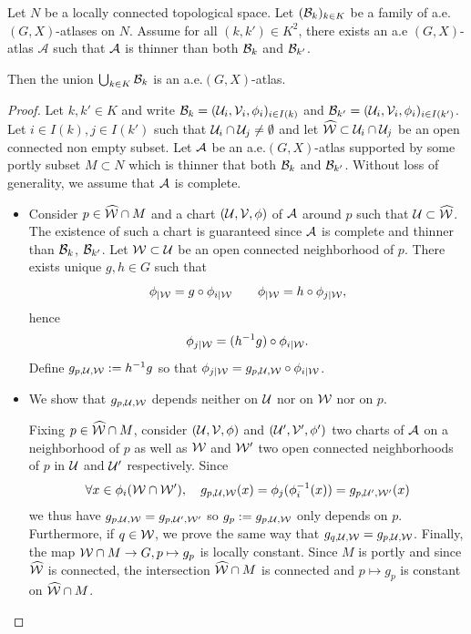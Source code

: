     \begin{lem} \label{lem:GX_atlas_union}
        Let $N$ be a locally connected topological space.
        Let $(\mathcal B_k)_{k\in K}$ be a family of a.e.$(G,X)$-atlases on $N$. Assume for  all $(k,k')\in K^2$, there exists an a.e $(G,X)$-atlas $\mathcal A$ such that $\mathcal A$ is thinner than both $\mathcal B_{k}$ and $\mathcal B_{k'}$.


            Then the union $\bigcup_{k\in K} \mathcal B_k$ is an a.e.$(G,X)$-atlas.
    \end{lem}
					\begin{proof}
					Let $k,k'\in K$ and write $\mathcal B_k=(\mathcal{U}_i,\mathcal V_i,\phi_i)_{i\in I(k)}$ and
					$\mathcal B_{k'}=(\mathcal{U}_i,\mathcal V_i,\phi_i)_{i\in I(k')}$.
					Let $i\in I(k), j\in I(k')$ such that $\mathcal{U}_i\cap \mathcal{U}_j \neq \emptyset$ and let $\widehat{\mathcal W} \subset\mathcal{U}_i\cap\mathcal{U}_j$ be an open connected non empty subset.
					Let $\mathcal A$ be an a.e.$(G,X)$-atlas supported by some portly subset $M\subset N$ which is thinner that both $\mathcal B_{k}$ and $\mathcal B_{k'}$. Without loss of generality, we assume that $\mathcal A$ is complete. 
					
					\begin{itemize}
					 \item Consider $p\in \widehat{\mathcal W}\cap M$ and a chart $(\mathcal{U},\mathcal V,\phi)$ of $\mathcal A$ around $p$ such that $\mathcal{U}\subset \widehat{\mathcal W}$. The existence of such a chart is guaranteed since $\mathcal A$ is  complete and thinner than $\mathcal B_k$, $\mathcal B_{k'}$.
					Let $\mathcal W \subset \mathcal{U}$ be an open connected neighborhood of $p$.
					There exists unique $g,h\in G$ such that
					$$\phi_{|\mathcal W} =g\circ \phi_{i|\mathcal W} \quad \quad  \phi_{|\mathcal W} =h\circ \phi_{j|\mathcal W},$$
					hence
					$$\phi_{j|\mathcal W}=(h^{-1} g)\circ \phi_{i|\mathcal W}.$$
					 Define $g_{p,\mathcal{U},\mathcal W}:=h^{-1}g$ so that $\phi_{j|\mathcal W}= g_{p,\mathcal{U},\mathcal W}\circ \phi_{i|\mathcal W}$.
				
					\item  We show that $g_{p,\mathcal{U},\mathcal W}$ depends neither on $\mathcal{U}$ nor on $\mathcal W$ nor on $p$.
					
					Fixing $p\in \widehat {\mathcal W}\cap M$, consider
					 $(\mathcal{U},\mathcal V,\phi)$ and $(\mathcal{U}',\mathcal V',\phi')$ two charts of $\mathcal A$ on a neighborhood of $p$ 
					as well as $\mathcal W$ and $\mathcal W'$ two open connected neighborhoods of  $p$ in $\mathcal{U}$ and $\mathcal{U}'$ respectively.
					Since $$\forall x\in \phi_i(\mathcal W\cap \mathcal W'),\quad g_{p,\mathcal{U},\mathcal W}(x)= \phi_j(\phi_i^{-1}(x))=g_{p,\mathcal{U}',\mathcal W'}(x)$$  we thus have $g_{p,\mathcal{U},\mathcal W}=g_{p,\mathcal{U}',\mathcal W'}$ so
					$g_p:=g_{p,\mathcal{U},\mathcal W}$ only depends on $p$. 
					Furthermore, if $q\in \mathcal W$, we prove the same way that
					$g_{q,\mathcal{U},\mathcal W}=g_{p,\mathcal{U},\mathcal W}$.
					Finally, the map $\mathcal W\cap M\rightarrow G, p\mapsto g_p$ is locally constant.
					Since $M$ is portly and since $\widehat {\mathcal W}$ is connected, the intersection $\widehat {\mathcal W} \cap M$ is connected and $p\mapsto g_p$ is constant on $\widehat {\mathcal W}\cap M$.
					

\end{itemize}
\end{proof}
